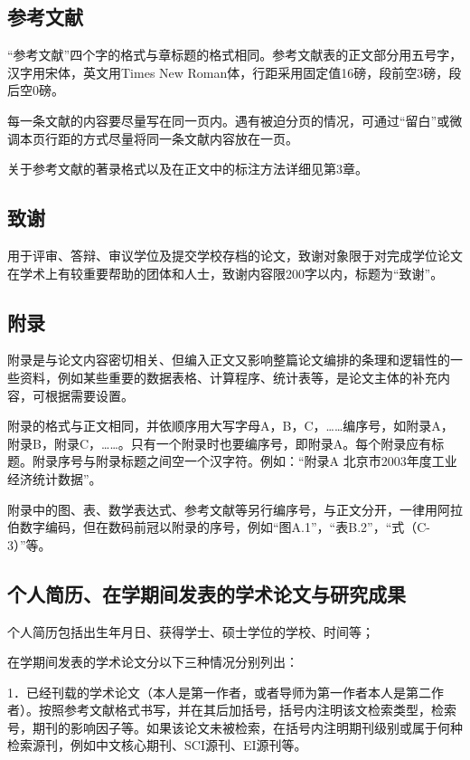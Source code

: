 \subsection{参考文献}

``参考文献''四个字的格式与章标题的格式相同。参考文献表的正文部分用五号字，汉字用宋体，英文用Times New Roman体，行距采用固定值16磅，段前空3磅，段后空0磅。

每一条文献的内容要尽量写在同一页内。遇有被迫分页的情况，可通过``留白''或微调本页行距的方式尽量将同一条文献内容放在一页。

关于参考文献的著录格式以及在正文中的标注方法详细见第3章。

\subsection{致谢}

用于评审、答辩、审议学位及提交学校存档的论文，致谢对象限于对完成学位论文在学术上有较重要帮助的团体和人士，致谢内容限200字以内，标题为“致谢”。 

\subsection{附录}

附录是与论文内容密切相关、但编入正文又影响整篇论文编排的条理和逻辑性的一些资料，例如某些重要的数据表格、计算程序、统计表等，是论文主体的补充内容，可根据需要设置。

附录的格式与正文相同，并依顺序用大写字母A，B，C，……编序号，如附录A，附录B，附录C，……。只有一个附录时也要编序号，即附录A。每个附录应有标题。附录序号与附录标题之间空一个汉字符。例如：“附录A  北京市2003年度工业经济统计数据”。

附录中的图、表、数学表达式、参考文献等另行编序号，与正文分开，一律用阿拉伯数字编码，但在数码前冠以附录的序号，例如“图A.1”，“表B.2”，“式（C-3）”等。 

\subsection{个人简历、在学期间发表的学术论文与研究成果}

个人简历包括出生年月日、获得学士、硕士学位的学校、时间等；

在学期间发表的学术论文分以下三种情况分别列出：

1．已经刊载的学术论文（本人是第一作者，或者导师为第一作者本人是第二作者）。按照参考文献格式书写，并在其后加括号，括号内注明该文检索类型，检索号，期刊的影响因子等。如果该论文未被检索，在括号内注明期刊级别或属于何种检索源刊，例如中文核心期刊、SCI源刊、EI源刊等。

